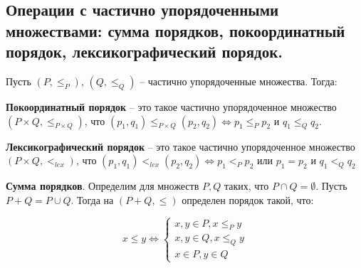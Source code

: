 \subsection{Операции с частично упорядоченными множествами: сумма порядков, покоординатный порядок, лексикографический порядок.}

Пусть $(P, \le_P)$, $(Q, \le_Q)$ -- частично упорядоченные множества. Тогда:

\textbf{Покоординатный порядок} -- это такое частично упорядоченное множество $(P \times Q, \le_{P \times Q})$, что $(p_1, q_1) \le_{P \times Q} (p_2, q_2) \Leftrightarrow p_1 \le_P p_2$ и $q_1 \le_Q q_2$.

\textbf{Лексикографический порядок} -- это такое частично упорядоченное множество $(P \times Q, <_{lex})$, что $(p_1, q_1) <_{lex} (p_2, q_2) \Leftrightarrow p_1 <_P p_2$ или $p_1 = p_2$ и $q_1 <_Q q_2$

\textbf{Сумма порядков}. Определим для множеств $P, Q$ таких, что $P \cap Q = \emptyset$. Пусть $P + Q = P \cup Q$. Тогда на $(P + Q, \le)$ определен порядок такой, что:

\begin{equation*}
    x \le y \Leftrightarrow
    \begin{cases}
        x, y \in P, x \le_P y \\
        x, y \in Q, x \le_Q y \\
        x \in P, y \in Q
    \end{cases}
\end{equation*}
